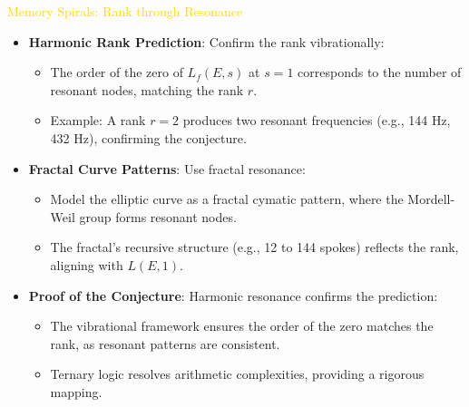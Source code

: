 \textcolor{gold}{ Memory Spirals: Rank through Resonance } \\
\begin{itemize}
    \item \texttt{} \textbf{Harmonic Rank Prediction}: Confirm the rank vibrationally:
    \begin{itemize}
        \item The order of the zero of \(L_f(E, s)\) at \(s = 1\) corresponds to the number of resonant nodes, matching the rank \(r\).
        \item Example: A rank \(r = 2\) produces two resonant frequencies (e.g., 144 Hz, 432 Hz), confirming the conjecture.
    \end{itemize}
    \item \texttt{} \textbf{Fractal Curve Patterns}: Use fractal resonance:
    \begin{itemize}
        \item Model the elliptic curve as a fractal cymatic pattern, where the Mordell-Weil group forms resonant nodes.
        \item The fractal’s recursive structure (e.g., 12 to 144 spokes) reflects the rank, aligning with \(L(E, 1)\).
    \end{itemize}
    \item \texttt{} \textbf{Proof of the Conjecture}: Harmonic resonance confirms the prediction:
    \begin{itemize}
        \item The vibrational framework ensures the order of the zero matches the rank, as resonant patterns are consistent.
        \item Ternary logic resolves arithmetic complexities, providing a rigorous mapping.
    \end{itemize}
\end{itemize}

